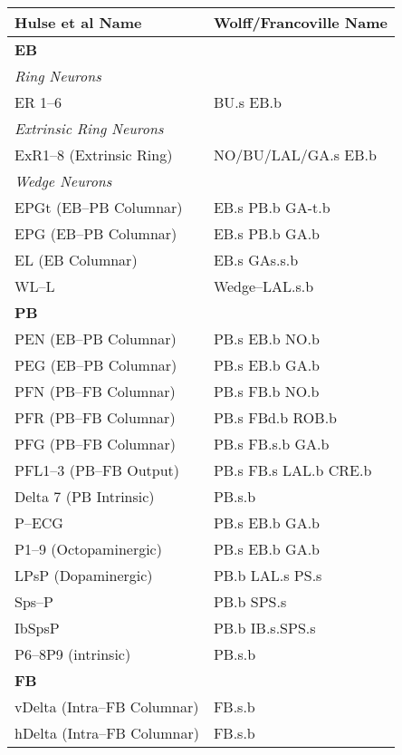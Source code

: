         \begin{table}[ht]
        \centering
        \begin{tabular}{l|l}
        \toprule
        \textbf{Hulse et al Name} & \textbf{Wolff/Francoville Name} \\
        \midrule
        \multicolumn{2}{l}{\textbf{EB}} \\[2pt]
        \textit{Ring Neurons} & \\
        ER 1–6 & BU.s EB.b \\
        \textit{Extrinsic Ring Neurons} & \\
        ExR1–8 (Extrinsic Ring) & NO/BU/LAL/GA.s EB.b \\
        \textit{Wedge Neurons} & \\
        EPGt (EB–PB Columnar) & EB.s PB.b GA-t.b \\
        EPG (EB–PB Columnar) & EB.s PB.b GA.b \\
        EL (EB Columnar) & EB.s GAs.s.b \\
        WL–L & Wedge–LAL.s.b \\
        \midrule
        \multicolumn{2}{l}{\textbf{PB}} \\[2pt]
        PEN (EB–PB Columnar) & PB.s EB.b NO.b \\
        PEG (EB–PB Columnar) & PB.s EB.b GA.b \\
        PFN (PB–FB Columnar) & PB.s FB.b NO.b \\
        PFR (PB–FB Columnar) & PB.s FBd.b ROB.b \\
        PFG (PB–FB Columnar) & PB.s FB.s.b GA.b \\
        PFL1–3 (PB–FB Output) & PB.s FB.s LAL.b CRE.b \\
        Delta 7 (PB Intrinsic) & PB.s.b \\
        P–ECG & PB.s EB.b GA.b \\
        P1–9 (Octopaminergic) & PB.s EB.b GA.b \\
        LPsP (Dopaminergic) & PB.b LAL.s PS.s \\
        Sps–P & PB.b SPS.s \\
        IbSpsP & PB.b IB.s.SPS.s \\
        P6–8P9 (intrinsic) & PB.s.b \\
        \midrule
        \multicolumn{2}{l}{\textbf{FB}} \\[2pt]
        vDelta (Intra–FB Columnar) & FB.s.b \\
        hDelta (Intra–FB Columnar) & FB.s.b \\

\end{tabular}
\end{table}
